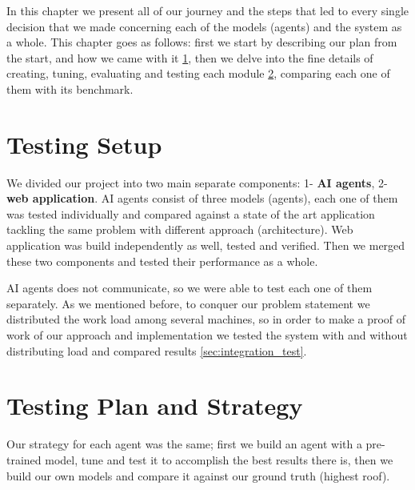 

In this chapter we present all of our journey and the steps that led to every single decision that we made concerning each of the models (agents) and the system as a whole. This chapter goes as follows: first we start by describing our plan from the start, and how we came with it \ref{sec:setup}, then we delve into the fine details of creating, tuning, evaluating and testing each module \ref{sec:plan}, comparing each one of them with its benchmark.



\section{Testing Setup}
\label{sec:setup}
We divided our project into two main separate components: 1- \textbf{AI agents}, 2- \textbf{web application}. AI agents consist of three models (agents), each one of them was tested individually and compared against a state of the art application tackling the same problem with different approach (architecture). Web application was build independently as well, tested and verified. Then we merged these two components and tested their performance as a whole.

AI agents does not communicate, so we were able to test each one of them separately. As we mentioned before, to conquer our problem statement we distributed the work load among several machines, so in order to make a proof of work of our approach and implementation we tested the system with and without distributing load and compared results \ref{sec:integration_test}.


\section{Testing Plan and Strategy}
\label{sec:plan}
Our strategy for each agent was the same; first we build an agent with a pre-trained model, tune and test it to accomplish the best results there is, then we build our own models and compare it against our ground truth (highest roof).\\

